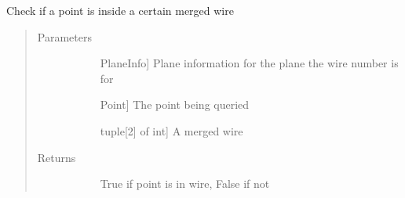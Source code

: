 \documentclass[letterpaper,10pt,english]{sphinxmanual}
\begin{document}
\begin{fulllineitems}
\label{\detokenize{utilities:utilities.pointInWire}}
Check if a point is inside a certain merged wire
\begin{quote}\begin{description}
\item[{Parameters}] \leavevmode\begin{description}
\item[{}] \leavevmode{[}PlaneInfo{]}
Plane information for the plane the wire number is for

\item[{}] \leavevmode{[}Point{]}
The point being queried

\item[{}] \leavevmode{[}tuple{[}2{]} of int{]}
A merged wire

\end{description}

\item[{Returns}] \leavevmode\begin{description}
\item[{}] \leavevmode
True if point is in wire, False if not

\end{description}

\end{description}\end{quote}

\end{fulllineitems}

\end{document}
